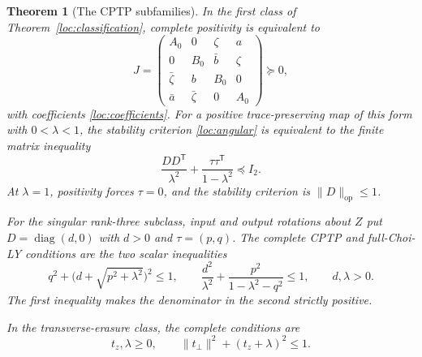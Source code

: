 \documentclass[reqno]{amsart}
\newtheorem{theorem}{Theorem}[section]
\theoremstyle{definition}
\theoremstyle{remark}
\DeclareMathOperator{\diag}{diag}
\begin{document}
\begin{theorem}[The CPTP subfamilies]\label{loc:cptp}
In the first class of Theorem~\ref{loc:classification}, complete
positivity is equivalent to
\begin{equation}\label{loc:choi-psd}
 J=\begin{pmatrix}
 A_0&0&\zeta&a\\
 0&B_0&\bar b&\zeta\\
 \bar\zeta&b&B_0&0\\
 \bar a&\bar\zeta&0&A_0
 \end{pmatrix}\succeq0,
\end{equation}
with coefficients \eqref{loc:coefficients}.  For a positive
trace-preserving map of this form with $0<\lambda<1$, the stability
criterion \eqref{loc:angular} is equivalent to the finite matrix
inequality
\begin{equation}\label{loc:lmi}
 \frac{DD^{\mathsf T}}{\lambda^2}
       +\frac{\tau\tau^{\mathsf T}}{1-\lambda^2}\preceq I_2.
\end{equation}
At $\lambda=1$, positivity forces $\tau=0$, and the stability
criterion is $\|D\|_{\mathrm{op}}\leq1$.

For the singular rank-three subclass, input and output rotations about
$Z$ put $D=\diag(d,0)$ with $d>0$ and $\tau=(p,q)$.
The complete CPTP and full-Choi-LY conditions are the two scalar
inequalities
\begin{equation}\label{loc:rank-three}
 q^2+\bigl(d+\sqrt{p^2+\lambda^2}\bigr)^2\leq1,
 \qquad
 \frac{d^2}{\lambda^2}
       +\frac{p^2}{1-\lambda^2-q^2}\leq1,
 \qquad d,\lambda>0.
\end{equation}
The first inequality makes the denominator in the second strictly
positive.

In the transverse-erasure class, the complete conditions are
\begin{equation}\label{loc:erasure-cptp}
 t_z,\lambda\geq0,\qquad
 \|t_\perp\|^2+(t_z+\lambda)^2\leq1.
\end{equation}
\end{theorem}
\end{document}
